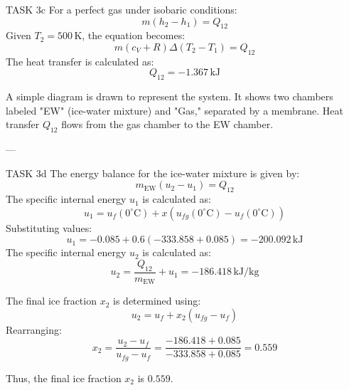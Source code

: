 TASK 3c  
For a perfect gas under isobaric conditions:  
\[
m(h_2 - h_1) = Q_{12}
\]  
Given \( T_2 = 500 \, \text{K} \), the equation becomes:  
\[
m(c_V + R) \Delta (T_2 - T_1) = Q_{12}
\]  
The heat transfer is calculated as:  
\[
Q_{12} = -1.367 \, \text{kJ}
\]  

A simple diagram is drawn to represent the system. It shows two chambers labeled "EW" (ice-water mixture) and "Gas," separated by a membrane. Heat transfer \( Q_{12} \) flows from the gas chamber to the EW chamber.

---

TASK 3d  
The energy balance for the ice-water mixture is given by:  
\[
m_{\text{EW}} (u_2 - u_1) = Q_{12}
\]  
The specific internal energy \( u_1 \) is calculated as:  
\[
u_1 = u_f(0^\circ\text{C}) + x \left( u_{fg}(0^\circ\text{C}) - u_f(0^\circ\text{C}) \right)
\]  
Substituting values:  
\[
u_1 = -0.085 + 0.6 \left( -333.858 + 0.085 \right) = -200.092 \, \text{kJ}
\]  
The specific internal energy \( u_2 \) is calculated as:  
\[
u_2 = \frac{Q_{12}}{m_{\text{EW}}} + u_1 = -186.418 \, \text{kJ/kg}
\]  

The final ice fraction \( x_2 \) is determined using:  
\[
u_2 = u_f + x_2 \left( u_{fg} - u_f \right)
\]  
Rearranging:  
\[
x_2 = \frac{u_2 - u_f}{u_{fg} - u_f} = \frac{-186.418 + 0.085}{-333.858 + 0.085} = 0.559
\]  

Thus, the final ice fraction \( x_2 \) is \( 0.559 \).